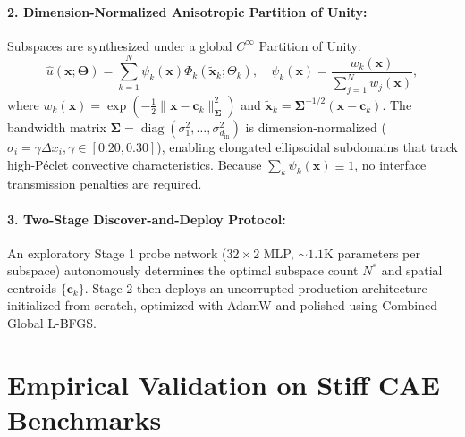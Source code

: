 \documentclass[10pt,a4paper,twocolumn]{article}
\begin{document}
\paragraph{2. Dimension-Normalized Anisotropic Partition of Unity:} Subspaces are synthesized under a global $C^\infty$ Partition of Unity:
\begin{equation}
\hat{u}(\mathbf{x}; \boldsymbol{\Theta}) = \sum_{k=1}^N \psi_k(\mathbf{x}) \Phi_k(\tilde{\mathbf{x}}_k; \Theta_k), \quad \psi_k(\mathbf{x}) = \frac{w_k(\mathbf{x})}{\sum_{j=1}^N w_j(\mathbf{x})},
\end{equation}
where $w_k(\mathbf{x}) = \exp(-\frac{1}{2}\|\mathbf{x}-\mathbf{c}_k\|_{\boldsymbol{\Sigma}}^2)$ and $\tilde{\mathbf{x}}_k = \boldsymbol{\Sigma}^{-1/2}(\mathbf{x}-\mathbf{c}_k)$. The bandwidth matrix $\boldsymbol{\Sigma} = \operatorname{diag}(\sigma_1^2, \dots, \sigma_{d_{\text{in}}}^2)$ is dimension-normalized ($\sigma_i = \gamma \Delta x_i, \gamma \in [0.20, 0.30]$), enabling elongated ellipsoidal subdomains that track high-P\'eclet convective characteristics. Because $\sum_k \psi_k(\mathbf{x}) \equiv 1$, no interface transmission penalties are required.

\paragraph{3. Two-Stage Discover-and-Deploy Protocol:} An exploratory Stage 1 probe network ($32 \times 2$ MLP, $\sim 1.1\text{K}$ parameters per subspace) autonomously determines the optimal subspace count $N^*$ and spatial centroids $\{\mathbf{c}_k\}$. Stage 2 then deploys an uncorrupted production architecture initialized from scratch, optimized with AdamW and polished using Combined Global L-BFGS.

\section{Empirical Validation on Stiff CAE Benchmarks}
\end{document}
